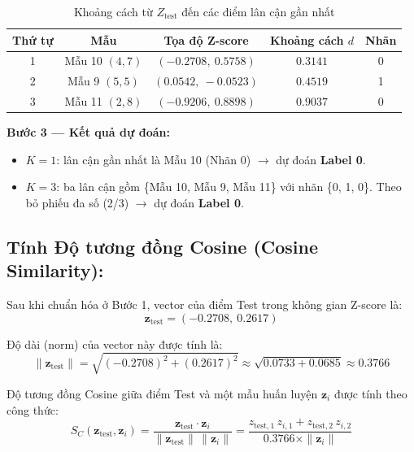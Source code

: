 \documentclass[12pt,a4paper]{article}
\begin{document}
\begin{table}[H]
    \centering
    \caption{Khoảng cách từ $Z_{\text{test}}$ đến các điểm lân cận gần nhất}
    \vspace{0.2cm}
    \renewcommand{\arraystretch}{1.4}
    \begin{tabular}{ccccc}
        \toprule
        \textbf{Thứ tự} & \textbf{Mẫu} & \textbf{Tọa độ Z-score} & \textbf{Khoảng cách $d$} & \textbf{Nhãn} \\
        \midrule
        1 & Mẫu 10 $(4, 7)$ & $(-0.2708,\ 0.5758)$ & $0.3141$ & 0 \\
        2 & Mẫu 9 $(5, 5)$  & $(0.0542,\ -0.0523)$ & $0.4519$ & 1 \\
        3 & Mẫu 11 $(2, 8)$ & $(-0.9206,\ 0.8898)$ & $0.9037$ & 0 \\
        \bottomrule
    \end{tabular}
\end{table}

\noindent\textbf{Bước 3 — Kết quả dự đoán:}
\begin{itemize}
    \item $K = 1$: lân cận gần nhất là Mẫu 10 (Nhãn 0) $\to$ dự đoán \textbf{Label 0}.
    \item $K = 3$: ba lân cận gồm \{Mẫu 10, Mẫu 9, Mẫu 11\} với nhãn \{0, 1, 0\}. Theo bỏ phiếu đa số (2/3) $\to$ dự đoán \textbf{Label 0}.
\end{itemize}
\subsection{Tính Độ tương đồng Cosine (Cosine Similarity):}

Sau khi chuẩn hóa ở Bước 1, vector của điểm Test trong không gian
Z-score là:
\begin{equation}
    \mathbf{z}_{\text{test}} = (-0.2708,\ 0.2617)
\end{equation}

Độ dài (norm) của vector này được tính là:
\begin{equation}
    \|\mathbf{z}_{\text{test}}\|
    = \sqrt{(-0.2708)^2 + (0.2617)^2}
    \approx \sqrt{0.0733 + 0.0685}
    \approx 0.3766
\end{equation}

Độ tương đồng Cosine giữa điểm Test và một mẫu huấn luyện
$\mathbf{z}_i$ được tính theo công thức:
\begin{equation}
    S_C(\mathbf{z}_{\text{test}}, \mathbf{z}_i)
    = \frac{\mathbf{z}_{\text{test}} \cdot \mathbf{z}_i}
           {\|\mathbf{z}_{\text{test}}\|\,\|\mathbf{z}_i\|}
    = \frac{z_{\text{test},1}\,z_{i,1} + z_{\text{test},2}\,z_{i,2}}
           {0.3766 \times \|\mathbf{z}_i\|}
\end{equation}
\end{document}
